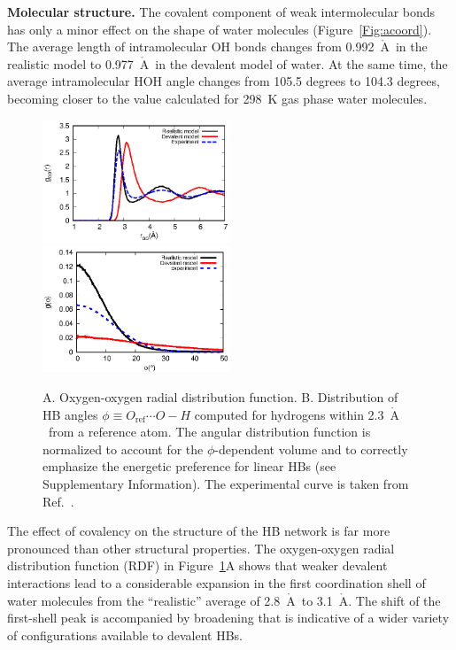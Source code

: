 \documentclass[journal=jacsat,manuscript=article]{achemso}
\newcommand{\Ang}{\ensuremath{\mathring{\text{A}}}}
\begin{document}
\textbf{Molecular structure.} The covalent component of weak intermolecular bonds has only a minor effect on the shape of water molecules (Figure~\ref{Fig:acoord}). 
The average length of intramolecular OH bonds changes from 0.992~\Ang\ in the realistic model to 0.977~\Ang\ in the devalent model of water. 
At the same time, the average intramolecular HOH angle changes from 105.5 degrees to 104.3 degrees, becoming closer to the value calculated for 298~K gas phase water molecules.

\begin{figure}
\includegraphics[width=0.5\textwidth]{new_rdf}
\includegraphics[width=0.5\textwidth]{new_adf}
\caption{A. Oxygen-oxygen radial distribution function. B. Distribution of HB angles $\phi \equiv O_{\text{ref}} \cdots O-H$ computed for hydrogens within 2.3~\Ang\ from a reference atom. The angular distribution function is normalized to account for the $\phi$-dependent volume and to correctly emphasize the energetic preference for linear HBs (see Supplementary Information). The experimental curve is taken from Ref.~.} \label{Fig:RDF}
\end{figure}

The effect of covalency on the structure of the HB network is far more pronounced than other structural properties. 
The oxygen-oxygen radial distribution function (RDF) in Figure~\ref{Fig:RDF}A shows that weaker devalent interactions lead to a considerable expansion in the first coordination shell of water molecules from the ``realistic'' average of 2.8~\Ang\ to 3.1~\Ang. 
The shift of the first-shell peak is accompanied by broadening that is indicative of a wider variety of configurations available to devalent HBs.
\end{document}
